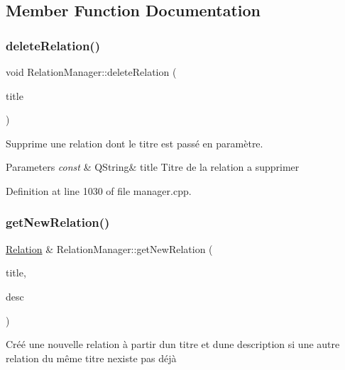 \subsection{Member Function Documentation}
\mbox{\label{class_relation_manager_a074413b3ed72a1342821e911c1fa3587}} 
\subsubsection{\texorpdfstring{delete\+Relation()}{deleteRelation()}}
{\footnotesize\ttfamily void Relation\+Manager\+::delete\+Relation (\begin{DoxyParamCaption}\item[{const Q\+String \&}]{title }\end{DoxyParamCaption})}



Supprime une relation dont le titre est passé en paramètre. 


\begin{DoxyParams}{Parameters}
{\em const} & Q\+String\& title Titre de la relation a supprimer \\
\hline
\end{DoxyParams}


Definition at line 1030 of file manager.\+cpp.

\mbox{\label{class_relation_manager_a1f9d556e0505105205e1fdb4905c4a80}} 
\subsubsection{\texorpdfstring{get\+New\+Relation()}{getNewRelation()}}
{\footnotesize\ttfamily \hyperlink{class_relation}{Relation} \& Relation\+Manager\+::get\+New\+Relation (\begin{DoxyParamCaption}\item[{const Q\+String \&}]{title,  }\item[{const Q\+String \&}]{desc }\end{DoxyParamCaption})}



Créé une nouvelle relation à partir d\textquotesingle{}un titre et d\textquotesingle{}une description si une autre relation du même titre n\textquotesingle{}existe pas déjà 


